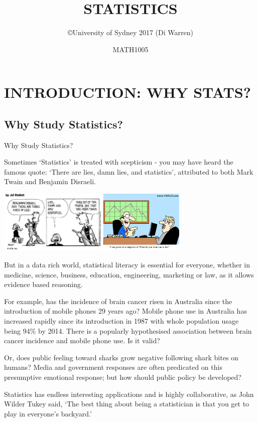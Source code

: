 \documentclass[t,xcolor=pdftex,dvipsnames,table]{beamer}
\title{\Huge STATISTICS}
\subtitle{}
\author{\copyright University of Sydney 2017 (Di Warren)}
\date{MATH1005}
\newcommand{\toclesssection}[1]{
  \setboolean{sectiontoc}{false}
  \setboolean{sectiontoc}{true}
}
\begin{document}
\section[Intro]{INTRODUCTION: WHY STATS?}


\subsection[]{Why Study Statistics?}
\begin{frame}{Why Study Statistics?}

Sometimes `Statistics' is treated with scepticism - you may have heard the famous quote: `There are lies, damn lies, and statistics', attributed to both Mark Twain and Benjamin Disraeli.  

\vspace{.5cm}
\includegraphics[height=3cm]{../images/StatsLies.jpg} \hspace{1cm} \includegraphics[height=3cm]{../images/StatsDodgy2.jpg}

\vspace{.5cm}
But in a data rich world, statistical literacy is essential for everyone, whether in medicine, science, business, education, engineering, marketing or law, as it allows evidence based reasoning. 
\end{frame}


\begin{frame}{}
For example, has the incidence of brain cancer risen in Australia since the introduction of mobile phones 29 years ago? Mobile phone use in Australia has increased rapidly since its introduction in 1987 with whole population usage being 94\% by 2014. There is a popularly hypothesised association between brain cancer incidence and mobile phone use. Is it valid?

\vspace{.5cm}
Or, does public feeling toward sharks grow negative following shark bites on humans? Media and government responses are often predicated on this presumptive emotional response; but how should public policy be developed?

\vspace{.5cm}
Statistics has endless interesting applications and is highly collaborative, as John Wilder Tukey said, 
`The best thing about being a statistician is that you get to play in everyone's backyard.'
\end{frame}
\end{document}
